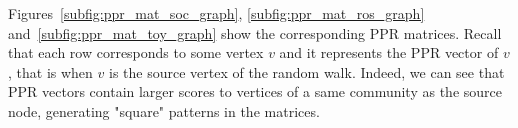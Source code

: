 Figures~\ref{subfig:ppr_mat_soc_graph}, \ref{subfig:ppr_mat_ros_graph} and~\ref{subfig:ppr_mat_toy_graph} show the corresponding PPR matrices. Recall that each row corresponds to some vertex $v$ and it represents the PPR vector of $v$, that is when $v$ is the source vertex of the random walk. Indeed, we can see that PPR vectors contain larger scores to vertices of a same community as the source node, generating "square" patterns in the matrices.






%
%

